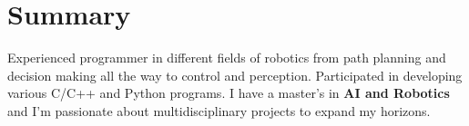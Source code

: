 
\section{Summary}
  \vspace{2pt}
  \resumeSubHeadingListStart
  \item{Experienced programmer in different fields of robotics from path planning and decision making all the way to control and perception. Participated in developing various C/C++ and Python programs. I have a master's in \textbf{AI and Robotics} and I'm passionate about multidisciplinary projects to expand my horizons.}
  \resumeSubHeadingListEnd
